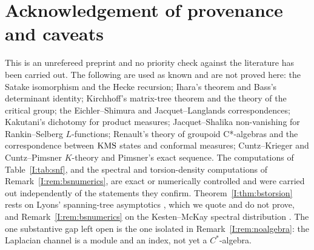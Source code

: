 \section*{Acknowledgement of provenance and caveats}

This is an unrefereed preprint and no priority check against the literature has been
carried out. The following are used as known and are not proved here: the Satake
isomorphism and the Hecke recursion; Ihara's theorem and Bass's determinant identity;
Kirchhoff's matrix-tree theorem and the theory of the critical group; the
Eichler--Shimura and Jacquet--Langlands correspondences; Kakutani's dichotomy for product
measures; Jacquet--Shalika non-vanishing for Rankin--Selberg $L$-functions; Renault's
theory of groupoid C*-algebras and the correspondence between $\mathrm{KMS}$ states and conformal
measures; Cuntz--Krieger and Cuntz--Pimsner $K$-theory and Pimsner's exact sequence. The
computations of Table~\ref{I:tab:snf}, and the spectral and torsion-density computations of
Remark~\ref{I:rem:bsnumerics}, are exact or numerically controlled and were carried out
independently of the statements they confirm. Theorem~\ref{I:thm:bstorsion} rests on
Lyons' spanning-tree asymptotics \cite{Lyons2005}, which we quote and do not prove, and
Remark~\ref{I:rem:bsnumerics} on the Kesten--McKay spectral distribution
\cite{Kesten1959,McKay1981}. The one substantive gap left open is the one isolated in
Remark~\ref{I:rem:noalgebra}: the Laplacian channel is a module and an index, not yet a
$C^*$-algebra.
